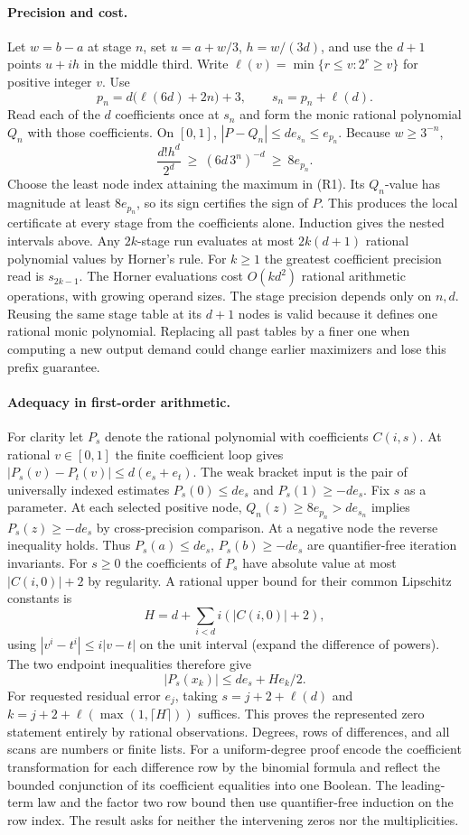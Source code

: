 \paragraph{Precision and cost.}
Let $w=b-a$ at stage $n$, set $u=a+w/3$, $h=w/(3d)$, and use
the $d+1$ points $u+ih$ in the middle third. Write
$\ell(v)=\min\{r\le v:2^r\ge v\}$ for positive integer $v$.
Use
\[
   p_n=d\bigl(\ell(6d)+2n\bigr)+3,\qquad s_n=p_n+\ell(d).
\]
Read each of the $d$ coefficients once at $s_n$ and form the monic
rational polynomial $Q_n$ with those coefficients. On $[0,1]$,
$|P-Q_n|\le d e_{s_n}\le e_{p_n}$. Because $w\ge3^{-n}$,
\[
   \frac{d!h^d}{2^d}\ \ge\ (6d\,3^n)^{-d}\ \ge\ 8e_{p_n}.
\]
Choose the least node index attaining the maximum in (R1). Its
$Q_n$-value has magnitude at least $8e_{p_n}$, so its sign certifies
the sign of $P$. This produces the local certificate at every stage
from the coefficients alone. Induction gives the nested intervals above.
Any $2k$-stage run evaluates at most $2k(d+1)$ rational polynomial
values by Horner's rule. For $k\ge1$ the greatest coefficient precision read is $s_{2k-1}$. The Horner evaluations cost $O(kd^2)$ rational arithmetic operations, with growing operand sizes. The stage precision depends only on $n,d$.
Reusing the same stage table at its $d+1$ nodes is valid because it
defines one rational monic polynomial. Replacing all past tables by
a finer one when computing a new output demand could change earlier
maximizers and lose this prefix guarantee.

\paragraph{Adequacy in first-order arithmetic.}
For clarity let $P_s$ denote the rational polynomial with coefficients
$C(i,s)$. At rational $v\in[0,1]$ the finite coefficient loop gives
$|P_s(v)-P_t(v)|\le d(e_s+e_t)$. The weak bracket input is the pair of
universally indexed estimates $P_s(0)\le de_s$ and
$P_s(1)\ge-de_s$. Fix $s$ as a parameter. At each selected positive
node, $Q_n(z)\ge8e_{p_n}>de_{s_n}$ implies $P_s(z)\ge-de_s$ by
cross-precision comparison. At a negative node the reverse inequality
holds. Thus $P_s(a)\le de_s$, $P_s(b)\ge-de_s$ are quantifier-free
iteration invariants. For $s\ge0$ the coefficients of $P_s$ have
absolute value at most $|C(i,0)|+2$ by regularity. A rational upper
bound for their common Lipschitz constants is
\[
   H=d+\sum_{i<d}i(|C(i,0)|+2),
\]
using $|v^i-t^i|\le i|v-t|$ on the unit interval (expand the
difference of powers). The two endpoint inequalities therefore give
\[
   |P_s(x_k)|\le de_s+He_k/2.                             \tag{R2}
\]
For requested residual error $e_j$, taking
$s=j+2+\ell(d)$ and $k=j+2+\ell(\max(1,\lceil H\rceil))$
suffices. This proves the represented zero statement entirely by
rational observations. Degrees, rows of differences, and all scans
are numbers or finite lists. For a uniform-degree proof encode the
coefficient transformation for each difference row by the binomial
formula and reflect the bounded conjunction of its coefficient
equalities into one Boolean. The leading-term law and the factor two
row bound then use quantifier-free induction on the row index.
The result asks for neither the intervening zeros nor the multiplicities.

